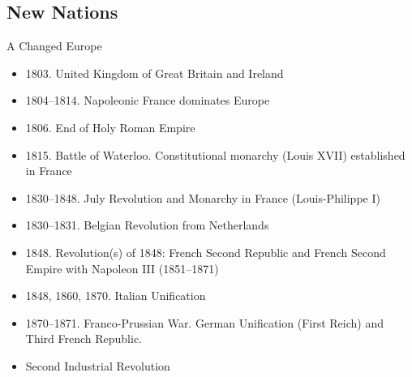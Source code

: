 \subsection{New Nations}
\begin{frame}{A Changed Europe}
	\begin{itemize}
		\item<1-4,6->1803. United Kingdom of Great Britain and Ireland
		\item<2-4,6->1804--1814. Napoleonic France dominates Europe
		\item<3-4,6->1806. End of Holy Roman Empire
		\item<4,6->1815. Battle of Waterloo. Constitutional monarchy (Louis XVII) established in France
		\item<6->1830--1848. July Revolution and Monarchy in France (Louis-Philippe I)
		\item<7->1830--1831. Belgian Revolution from Netherlands
		\item<8->1848. Revolution(s) of 1848: French Second Republic and French Second Empire with Napoleon III (1851--1871)
		\item<9->1848, 1860, 1870. Italian Unification
		\item<10->1870--1871. Franco-Prussian War. German Unification (First Reich) and Third French Republic.
		\item<11->Second Industrial Revolution
	\end{itemize}
\end{frame}
